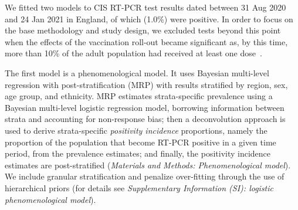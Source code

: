 \documentclass[9pt,twocolumn,twoside]{pnas-new}
\begin{document}
We fitted two models to  CIS RT-PCR test results dated between 31 Aug 2020 and 24 Jan 2021 in England, of which  (1.0\%) were positive.
In order to focus on the base methodology and study design, we excluded tests beyond this point when the effects of the vaccination roll-out became significant as, by this time, more than 10\% of the adult population had received at least one dose~\citep{whoCovidDashboard}.

The first model is a phenomenological model. It uses Bayesian multi-level regression with post-stratification (MRP) with results stratified by region, sex, age group, and ethnicity. %
MRP estimates strata-specific prevalence using a Bayesian multi-level logistic regression model, borrowing information between strata and accounting for non-response bias; then a deconvolution approach is used to derive strata-specific {\it positivity incidence} proportions, namely the proportion of the population that become RT-PCR positive in a given time period, from the prevalence estimates; and finally, the positivity incidence estimates are post-stratified (\textit{Materials and Methods: Phenomenological model}). We include granular stratification and penalize over-fitting through the use of hierarchical priors (for details see \textit{Supplementary Information (SI): logistic phenomenological model}).
\end{document}
